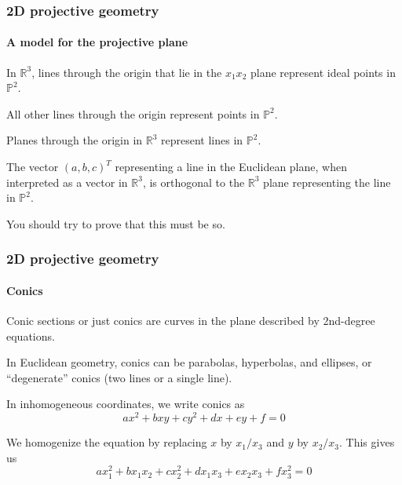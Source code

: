 \documentclass[aspectratio=169]{beamer}
\def\Rset{\mathbb{R}}
\def\Pset{\mathbb{P}}
\begin{document}
\begin{frame}
\frametitle{2D projective geometry}
\framesubtitle{A model for the projective plane}

In $\Rset^3$, \alert{lines} through the origin that lie
in the $x_1x_2$ plane
represent \alert{ideal points} in $\Pset^2$.

\medskip

\alert{All other lines} through the origin represent \alert{points} in
$\Pset^2$.

\medskip

\alert{Planes} through the origin in $\Rset^3$ represent \alert{lines} in
$\Pset^2$.

\medskip

The vector $(a,b,c)^T$ representing a line in the Euclidean plane,
when interpreted as a vector in $\Rset^3$, is \alert{orthogonal
to the $\Rset^3$ plane representing the line in $\Pset^2$}.

\medskip

You should try to prove that this must be so.

\end{frame}


\begin{frame}
\frametitle{2D projective geometry}
\framesubtitle{Conics}

\alert{Conic sections} or just \alert{conics} are curves in the plane
described by 2nd-degree equations.

\medskip

In Euclidean geometry, conics can be parabolas, hyperbolas, and
ellipses, or ``degenerate'' conics (two lines or a single line).

\medskip

In inhomogeneous coordinates, we write conics as
\begin{equation*}
ax^2 + bxy + cy^2 + dx + ey + f = 0
\end{equation*}

\medskip

We homogenize the equation by replacing $x$ by $x_1/x_3$ and $y$ by
$x_2/x_3$.  This gives us
\begin{equation*}
ax_1^2 + bx_1x_2 + cx_2^2 + dx_1x_3 + ex_2x_3 + fx_3^2 = 0
\end{equation*}

\end{frame}
\end{document}
